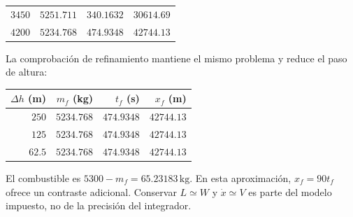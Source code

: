 \begin{center}
\begin{tabular}{rrrr}
$3450$ & $5251.711$ & $340.1632$ & $30614.69$\\
$4200$ & $5234.768$ & $474.9348$ & $42744.13$\\
\bottomrule\end{tabular}\end{center}La comprobación de refinamiento mantiene el mismo problema y reduce el paso de altura:\begin{center}\begin{tabular}{rrrr}
\toprule $\Delta h$ (m) & $m_f$ (kg) & $t_f$ (s) & $x_f$ (m)\\\midrule
$250$ & $5234.768$ & $474.9348$ & $42744.13$\\
$125$ & $5234.768$ & $474.9348$ & $42744.13$\\
$62.5$ & $5234.768$ & $474.9348$ & $42744.13$\\
\bottomrule\end{tabular}\end{center}El combustible es $5300-m_f=65.23183\,\mathrm{kg}$. En esta aproximación, $x_f=90t_f$ ofrece un contraste adicional. Conservar $L\simeq W$ y $\dot x\simeq V$ es parte del modelo impuesto, no de la precisión del integrador.
